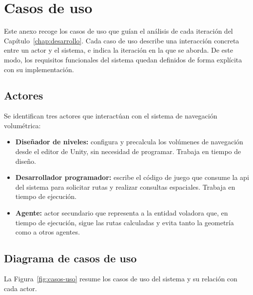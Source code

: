 \chapter{Casos de uso}
\label{anexo:casos-uso}

Este anexo recoge los casos de uso que guían el análisis de cada iteración del Capítulo~\ref{chap:desarrollo}.
Cada caso de uso describe una interacción concreta entre un actor y el sistema, e indica la iteración en la que se aborda.
De este modo, los requisitos funcionales del sistema quedan definidos de forma explícita con su implementación.

\section{Actores}

Se identifican tres actores que interactúan con el sistema de navegación volumétrica:

\begin{itemize}
  \item \textbf{Diseñador de niveles:} configura y precalcula los volúmenes de navegación desde el editor de Unity, sin necesidad de programar. Trabaja en tiempo de diseño.
  \item \textbf{Desarrollador programador:} escribe el código de juego que consume la \acrshort{api} del sistema para solicitar rutas y realizar consultas espaciales. Trabaja en tiempo de ejecución.
  \item \textbf{Agente:} actor secundario que representa a la entidad voladora que, en tiempo de ejecución, sigue las rutas calculadas y evita tanto la geometría como a otros agentes.
\end{itemize}

\section{Diagrama de casos de uso}

La Figura~\ref{fig:casos-uso} resume los casos de uso del sistema y su relación con cada actor.

